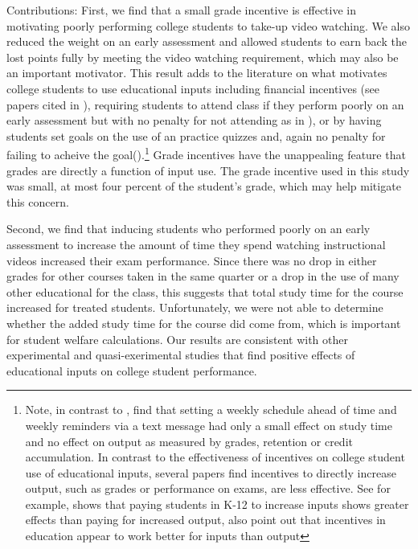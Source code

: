 \documentclass[12pt]{article}
\begin{document}
Contributions:  First, we find that a small grade incentive is effective in motivating poorly performing college students to take-up video watching. We also reduced the weight on an early assessment and allowed students to earn back the lost points fully by meeting the video watching requirement, which may also be an important motivator. This result adds to the literature on what motivates college students to use educational inputs including financial incentives (see papers cited in \textcite{gmr2011}), requiring students to attend class if they perform poorly on an early assessment but with no penalty for not attending as in \textcite{dgm2010}), or by having students set goals on the use of an practice quizzes and, again no penalty for failing to acheive the goal(\textcite{cgpr2020}).\footnote{Note, in contrast to \textcite{cgpr2020}, \textcite{oppp2019} find that setting a weekly schedule ahead of time and weekly reminders via a text message had only a small effect on study time and no effect on output as measured by grades, retention or credit accumulation.  In contrast to the effectiveness of incentives on college student use of educational inputs, several papers find incentives to directly increase output, such as grades or performance on exams, are less effective.  See for example, \textcite{fryer2011} shows that paying students in K-12 to increase inputs shows greater effects than paying for increased output, \textcite{gmr2011} also point out that incentives in education appear to work better for inputs than output} Grade incentives have the unappealing feature that grades are directly a function of input use.  The grade incentive used in this study was small, at most four percent of the student's grade, which may help mitigate this concern. 

Second, we find that inducing students who performed poorly on an early assessment to increase the amount of time they spend watching instructional videos increased their exam performance. Since there was no drop in either grades for other courses taken in the same quarter or a drop in the use of many other educational for the class, this suggests that total study time for the course increased for treated students.  Unfortunately, we were not able to determine whether the added study time for the course did come from, which is important for student welfare calculations.  Our results are consistent with other experimental and quasi-exerimental studies that find positive effects of educational inputs on college student performance.  %
\end{document}
